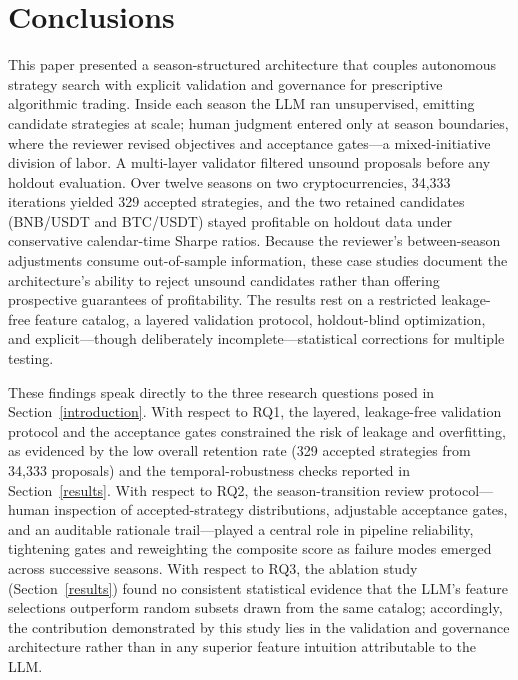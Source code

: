 \documentclass[analytics,article,submit,pdftex,moreauthors]{Definitions/mdpi}
\begin{document}
\section{Conclusions}\label{conclusions}

This paper presented a season-structured architecture that couples autonomous strategy search with explicit validation and governance for prescriptive algorithmic trading. Inside each season the LLM ran unsupervised, emitting candidate strategies at scale; human judgment entered only at season boundaries, where the reviewer revised objectives and acceptance gates---a mixed-initiative division of labor. A multi-layer validator filtered unsound proposals before any holdout evaluation. Over twelve seasons on two cryptocurrencies, 34,333 iterations yielded 329 accepted strategies, and the two retained candidates (BNB/USDT and BTC/USDT) stayed profitable on holdout data under conservative calendar-time Sharpe ratios. Because the reviewer's between-season adjustments consume out-of-sample information, these case studies document the architecture's ability to reject unsound candidates rather than offering prospective guarantees of profitability. The results rest on a restricted leakage-free feature catalog, a layered validation protocol, holdout-blind optimization, and explicit---though deliberately incomplete---statistical corrections for multiple testing.

These findings speak directly to the three research questions posed in Section~\ref{introduction}. With respect to RQ1, the layered, leakage-free validation protocol and the acceptance gates constrained the risk of leakage and overfitting, as evidenced by the low overall retention rate (329 accepted strategies from 34,333 proposals) and the temporal-robustness checks reported in Section~\ref{results}. With respect to RQ2, the season-transition review protocol---human inspection of accepted-strategy distributions, adjustable acceptance gates, and an auditable rationale trail---played a central role in pipeline reliability, tightening gates and reweighting the composite score as failure modes emerged across successive seasons. With respect to RQ3, the ablation study (Section~\ref{results}) found no consistent statistical evidence that the LLM's feature selections outperform random subsets drawn from the same catalog; accordingly, the contribution demonstrated by this study lies in the validation and governance architecture rather than in any superior feature intuition attributable to the LLM.
\end{document}
